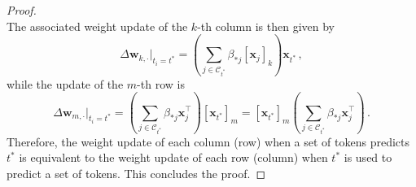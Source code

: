 \begin{proof}
\begin{equation}
\end{equation}
%
The associated weight update of the $k$-th column is then given by
%
\begin{equation}
    \Delta \bm{w}_{k, \cdot} \bigg|_{t_i = t^*} = \left(\sum_{j \in \mathcal{C}_{t^*}}\beta_{*j}[\bm{x}_j]_k\right)\bm{x}_{t^*} \,,
\end{equation}
%
while the update of the $m$-th row is
%
\begin{equation}
    \Delta \bm{w}_{m, \cdot} \bigg|_{t_i = t^*} =  \left(\sum_{j \in \mathcal{C}_{t^*}}\beta_{*j}\bm{x}_j^\top\right) [\bm{x}_{t^*}]_m
    = [\bm{x}_{t^*}]_m \left(\sum_{j \in \mathcal{C}_{t^*}}\beta_{*j}\bm{x}_j^\top\right)\,.
\end{equation}
%
Therefore, the weight update of each column (row) when a set of tokens predicts $t^*$ is equivalent to the weight update of each row (column) when $t^*$ is used to predict a set of tokens.
%
This concludes the proof.
%
\end{proof}
